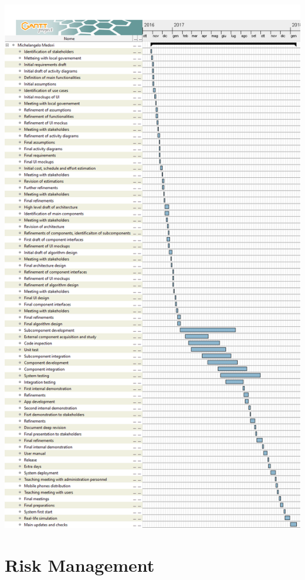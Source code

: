 \documentclass{article}
\begin{document}
\begin{flushleft}
\newpage
\includegraphics[scale=0.3]{ganttMike}
\newpage

\section{Risk Management } %


\end{flushleft}
\end{document}
